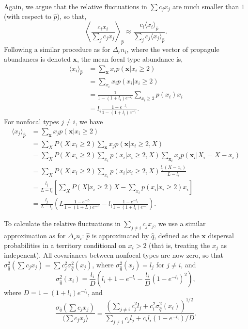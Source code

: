 \documentclass[12pt]{article}
\begin{document}
Again, we argue that the relative fluctuations in $\sum c_j x_j$ are much smaller than $1$ (with respect to $\hat{p}$), so that,
\begin{equation}
\left\langle \frac{c_i x_i}{\sum_j c_j x_j} \right\rangle_{\hat{p}}\approx  \frac{c_i \langle x_i \rangle_{\hat{p}}}{\sum_j c_j \langle x_j\rangle_{\hat{p}}}.\label{eq:meanfielda}
\end{equation}
Following a similar procedure as for $\Delta_r n_i$, where the vector of propagule abundances is denoted ${\mathbf x}$, the mean focal type abundance is, 
\begin{align}
\langle x_i \rangle_{\hat{p}}&=\sum_{\mathbf x} x_i p(\mathbf x|x_i\geq 2)\nonumber \\
&=\sum_{x_i} x_i p(x_i|x_i\geq 2) \nonumber\\
&=\frac{1}{1-(1+l_i)e^{-l_i}}\sum_{x_i\geq 2} p(x_i)x_i\nonumber\\
&=l_i\frac{1-e^{-l_i}}{1-(1+l_i)e^{-l_i}}.
\end{align}
For nonfocal types $j\neq i$, we have
\begin{align}
\langle x_j \rangle_{\hat{p}}&=\sum_{\mathbf x} x_j p(\mathbf x|x_i\geq 2)\nonumber \\
&=\sum_{X}P(X|x_i\geq 2)\sum_{\mathbf x} x_j p({\mathbf x}|x_i\geq 2,X)\nonumber\\
&=\sum_{X}P(X|x_i\geq 2)\sum_{x_i} p(x_i|x_i\geq 2,X) \sum_{\mathbf x_i} x_j p(\mathbf x_i|X_i=X-x_i)\nonumber\\
&=\sum_{X}P(X|x_i\geq 2)\sum_{x_i}p(x_i|x_i\geq 2,X) \frac{l_j(X-x_i)}{L-l_i} \nonumber\\
&=\frac{l_j}{L-l_i}\left[\sum_{X}P(X|x_i\geq 2)X - \sum_{x_i}p(x_i|x_i\geq 2) x_i \right]\nonumber\\
&=\frac{l_j}{L-l_i}\left( L\frac{1-e^{-L}}{1-(1+L)e^{-L}}- l_i\frac{1-e^{-l_i}}{1-(1+l_i)e^{-l_i}}\right). 
\end{align}

To calculate the relative fluctuations in $\sum_{j\neq i} c_j x_j$, we use a similar approximation as for $\Delta_r n_i$: $\hat{p}$ is approximated by $\hat{q}$, defined as the ${\mathbf x}$ dispersal probabilities in a territory conditional on $x_i>2$ (that is, treating the $x_j$ as indepenent). All covariances between nonfocal types are now zero, so that $\sigma_{\hat{q}}^2(\sum c_j x_j)=\sum c_j^2 \sigma_{\hat{q}}^2(x_j)$, where $\sigma_{\hat{q}}^2(x_j)=l_j$ for $j\neq i$, and  
\begin{equation}
\sigma_{\hat{q}}^2(x_i)=\frac{l_i}{D}\left(l_i+1-e^{-l_i}-\frac{l_i}{D}\left(1-e^{-l_i}\right)^2\right),
\end{equation}
where $D= 1-(1+l_i)e^{-l_i}$, and 
\begin{equation}
\frac{\sigma_{\hat{q}}(\sum c_j x_j)}{\langle\sum c_j x_j\rangle} = \frac{\left(\sum_{j\neq i} c_j^2 l_j + c_i^2 \sigma_{\hat{q}}^2(x_i)\right)^{1/2}}{\sum_{j\neq i} c_j l_j + c_i l_i (1-e^{-l_i})/D} \label{eq:cva}.
\end{equation}
\end{document}
